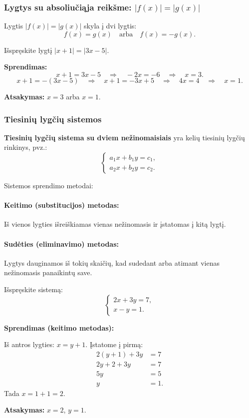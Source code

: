 \subsubsection{Lygtys su absoliučiąja reikšme: $|f(x)| = |g(x)|$}

Lygtis $|f(x)| = |g(x)|$ skyla į dvi lygtis:
\[
    f(x) = g(x) \quad \text{arba} \quad f(x) = -g(x).
\]

\begin{example}
Išspręskite lygtį $|x + 1| = |3x - 5|$.

\textbf{Sprendimas:}
\[
x + 1 = 3x - 5 \quad \Rightarrow \quad -2x = -6 \quad \Rightarrow \quad x = 3.
\]
\[
x + 1 = -(3x - 5) \quad \Rightarrow \quad x + 1 = -3x + 5 \quad \Rightarrow \quad 4x = 4 \quad \Rightarrow \quad x = 1.
\]

\textbf{Atsakymas:} $x = 3$ arba $x = 1$.
\end{example}

\subsubsection{Tiesinių lygčių sistemos}

\begin{definition}
\textbf{Tiesinių lygčių sistema su dviem nežinomaisiais} yra kelių tiesinių lygčių rinkinys, pvz.:
\[
\begin{cases}
    a_1 x + b_1 y = c_1, \\
    a_2 x + b_2 y = c_2.
\end{cases}
\]
\end{definition}

Sistemos sprendimo metodai:

\paragraph{Keitimo (substitucijos) metodas:} Iš vienos lygties išreiškiamas vienas nežinomasis ir įstatomas į kitą lygtį.

\paragraph{Sudėties (eliminavimo) metodas:} Lygtys dauginamos iš tokių skaičių, kad sudedant arba atimant vienas nežinomasis panaikintų save.

\begin{example}
Išspręskite sistemą:
\[
\begin{cases}
    2x + 3y = 7, \\
    x - y = 1.
\end{cases}
\]

\textbf{Sprendimas (keitimo metodas):}

Iš antros lygties: $x = y + 1$. Įstatome į pirmą:
\begin{align*}
    2(y + 1) + 3y &= 7 \\
    2y + 2 + 3y &= 7 \\
    5y &= 5 \\
    y &= 1.
\end{align*}
Tada $x = 1 + 1 = 2$.

\textbf{Atsakymas:} $x = 2$, $y = 1$.
\end{example}

